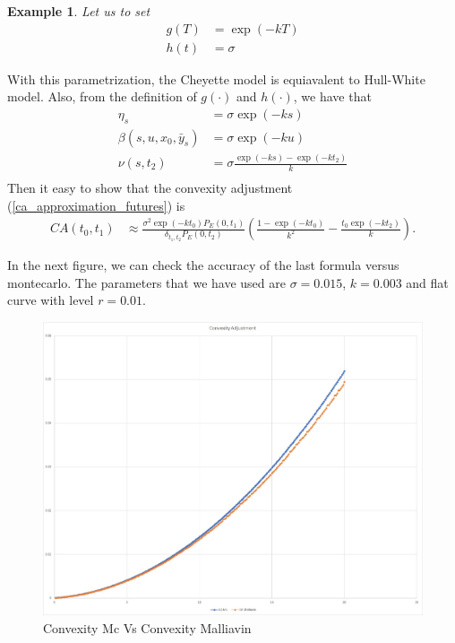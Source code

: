 \documentclass[a4paper,10pt]{article}
\newtheorem{example}[theorem]{Example}
\newcommand{\1}{\mathbf{1}}
\begin{document}
\begin{example}\label{example_ca_future}
Let us to set 
\begin{align*}
g(T) &= \exp(-kT) \\
h(t) &= \sigma
\end{align*}
\end{example}
With this parametrization, the Cheyette model is equiavalent to Hull-White model. Also, from the definition of $g(\cdot)$ and $h(\cdot)$, we have that
\begin{align*}
\eta_s &= \sigma \exp(-ks)\\
\beta(s,u, x_0, \bar{y}_s) &= \sigma \exp(-ku) \\
\nu(s,t_2) &= \sigma \frac{\exp(-ks) - \exp(-kt_2)}{k}\\
\end{align*}
Then it easy to show that the convexity adjustment (\ref{ca_approximation_futures}) is
\begin{align*}
CA(t_0,t_1) & \approx \frac{\sigma^{2} \exp(-k t_0)  P_{E}(0,t_1)}{\delta_{t_1,t_2} P_{E}(0,t_2)} \left(\frac{1 - \exp(- k t_0)}{k^{2}} - \frac{t_0 \exp(-k t_2)}{k} \right).   
\end{align*}

In the next figure, we can check the accuracy of the last formula versus montecarlo. The parameters that we have used are $\sigma=0.015$, $k=0.003$ and flat curve with level $r=0.01$.

\begin{figure}[h]
	\begin{center}
		\includegraphics[scale=0.3]{Figures/future_convexity.jpg}
		\caption{Convexity Mc Vs Convexity Malliavin}
	\end{center}
\end{figure} 
\end{document}
